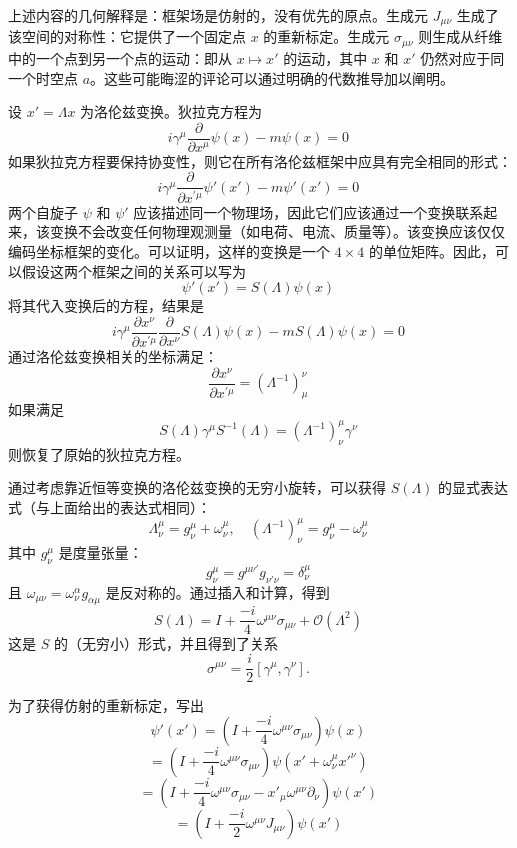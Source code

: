 上述内容的几何解释是：框架场是仿射的，没有优先的原点。生成元 \( J_{\mu \nu} \) 生成了该空间的对称性：它提供了一个固定点 \( x \) 的重新标定。生成元 \( \sigma_{\mu \nu} \) 则生成从纤维中的一个点到另一个点的运动：即从 \( x \mapsto x' \) 的运动，其中 \( x \) 和 \( x' \) 仍然对应于同一个时空点 \( a \)。这些可能晦涩的评论可以通过明确的代数推导加以阐明。

设 \( x' = \Lambda x \) 为洛伦兹变换。狄拉克方程为  
\[
i\gamma^{\mu} \frac{\partial}{\partial x^{\mu}} \psi(x) - m \psi(x) = 0~
\]  
如果狄拉克方程要保持协变性，则它在所有洛伦兹框架中应具有完全相同的形式：  
\[
i\gamma^{\mu} \frac{\partial}{\partial x^{\prime \mu}} \psi'(x') - m \psi'(x') = 0~
\]  
两个自旋子 \( \psi \) 和 \( \psi' \) 应该描述同一个物理场，因此它们应该通过一个变换联系起来，该变换不会改变任何物理观测量（如电荷、电流、质量等）。该变换应该仅仅编码坐标框架的变化。可以证明，这样的变换是一个 \( 4 \times 4 \) 的单位矩阵。因此，可以假设这两个框架之间的关系可以写为  
\[
\psi'(x') = S(\Lambda) \psi(x)~
\]  
将其代入变换后的方程，结果是  
\[
i\gamma^{\mu} \frac{\partial x^{\nu}}{\partial x^{\prime \mu}} \frac{\partial}{\partial x^{\nu}} S(\Lambda) \psi(x) - m S(\Lambda) \psi(x) = 0~
\]  
通过洛伦兹变换相关的坐标满足：  
\[
\frac{\partial x^{\nu}}{\partial x^{\prime \mu}} = \left(\Lambda^{-1}\right)^{\nu}_{\mu}~
\]  
如果满足  
\[
S(\Lambda) \gamma^{\mu} S^{-1}(\Lambda) = \left(\Lambda^{-1}\right)^{\mu}_{\nu} \gamma^{\nu}~
\]  
则恢复了原始的狄拉克方程。

通过考虑靠近恒等变换的洛伦兹变换的无穷小旋转，可以获得 \( S(\Lambda) \) 的显式表达式（与上面给出的表达式相同）：  
\[
\Lambda^\mu_{\nu} = g^\mu_{\nu} + \omega^\mu_{\nu}, \quad (\Lambda^{-1})^\mu_{\nu} = g^\mu_{\nu} - \omega^\mu_{\nu}~
\]  
其中 \( g^\mu_{\nu} \) 是度量张量：  
\[
g^\mu_{\nu} = g^{\mu \nu'} g_{\nu' \nu} = \delta^\mu_{\nu}~
\]  
且 \( \omega_{\mu \nu} = \omega^\alpha_\nu g_{\alpha \mu} \) 是反对称的。通过插入和计算，得到  
\[
S(\Lambda) = I + \frac{-i}{4} \omega^{\mu \nu} \sigma_{\mu \nu} + \mathcal{O}(\Lambda^2)~
\]  
这是 \( S \) 的（无穷小）形式，并且得到了关系  
\[
\sigma^{\mu \nu} = \frac{i}{2} [\gamma^\mu, \gamma^\nu].~
\]  

为了获得仿射的重新标定，写出  
\[
\psi'(x') = \left(I + \frac{-i}{4} \omega^{\mu \nu} \sigma_{\mu \nu}\right) \psi(x)~
\]  
\[
= \left(I + \frac{-i}{4} \omega^{\mu \nu} \sigma_{\mu \nu}\right) \psi(x' + \omega^\mu_\nu x'^\nu)~
\]  
\[
= \left(I + \frac{-i}{4} \omega^{\mu \nu} \sigma_{\mu \nu} - x'_\mu \omega^{\mu \nu} \partial_\nu \right) \psi(x')~
\]  
\[
= \left(I + \frac{-i}{2} \omega^{\mu \nu} J_{\mu \nu} \right) \psi(x')~
\]  

